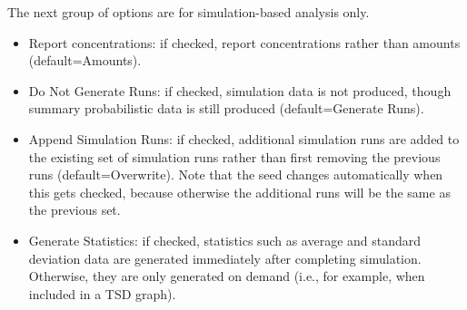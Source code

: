 \documentclass[titlepage,11pt]{article}
\begin{document}
\noindent
The next group of options are for simulation-based analysis only.
\begin{itemize}
\item Report concentrations: if checked, report concentrations rather than amounts (default=Amounts).
\item Do Not Generate Runs: if checked, simulation data is not produced, though summary probabilistic data is still produced (default=Generate Runs).
\item Append Simulation Runs: if checked, additional simulation runs are added to the existing set of simulation runs rather than first removing the previous runs (default=Overwrite).  Note that the seed changes automatically when this gets checked, because otherwise the additional runs will be the same as the previous set.
\item Generate Statistics: if checked, statistics such as average and standard deviation data are generated immediately after completing simulation.  Otherwise, they are only generated on demand (i.e., for example, when included in a TSD graph).
\end{itemize} 
\end{document}
